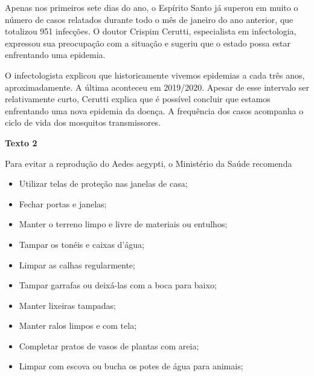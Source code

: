 \begin{myquote}
Apenas nos primeiros sete dias do ano, o Espírito Santo já superou em muito o
número de casos relatados durante todo o mês de janeiro do ano anterior, que
totalizou 951 infecções. O doutor Crispim Cerutti, especialista em
infectologia, expressou sua preocupação com a situação e sugeriu que o estado
possa estar enfrentando uma epidemia.

O infectologista explicou que historicamente vivemos epidemias a
cada três anos, aproximadamente. A última aconteceu em 2019/2020.
Apesar de esse intervalo ser relativamente curto, Cerutti explica que 
é possível concluir que estamos enfrentando uma nova epidemia da doença. 
A frequência dos casos acompanha o ciclo de vida dos mosquitos transmissores.


\textbf{Texto 2}

Para evitar a reprodução do Aedes aegypti, o Ministério da Saúde recomenda 

\begin{itemize}
  
  \item Utilizar telas de proteção nas janelas de casa;
  
  \item Fechar portas e janelas;
  
  \item Manter o terreno limpo e livre de materiais ou entulhos;
  
  \item Tampar os tonéis e caixas d'água;
  
  \item Limpar as calhas regularmente;
  
  \item Tampar garrafas ou deixá-las com a boca para baixo;
  
  \item Manter lixeiras tampadas;
  
  \item Manter ralos limpos e com tela;
  
  \item Completar pratos de vasos de plantas com areia;
  
  \item Limpar com escova ou bucha os potes de água para animais;
  

\end{itemize}
\end{myquote}
